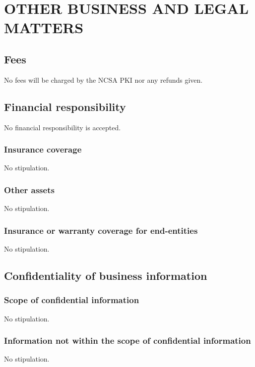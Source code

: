 \documentclass[10pt]{article}
\begin{document}
\section{OTHER BUSINESS AND LEGAL MATTERS}
\subsection{Fees}

No fees will be charged by the NCSA PKI nor any refunds given.

\subsection{Financial responsibility}

No financial responsibility is accepted. 

\subsubsection{Insurance coverage}

No stipulation.

\subsubsection{Other assets}

No stipulation.

\subsubsection{Insurance or warranty coverage for end-entities}

No stipulation.

\subsection{Confidentiality of business information}
\subsubsection{Scope of confidential information}

No stipulation.

\subsubsection{Information not within the scope of confidential information}

No stipulation.
\end{document}
